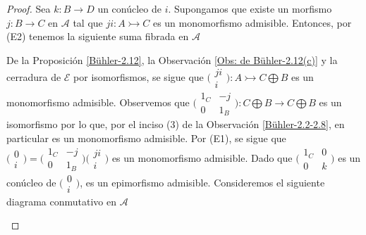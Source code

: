 \documentclass[tesis]{subfiles}
\begin{document}
\begin{proof}
    Sea $k:B\to D$ un conúcleo de $i$. Supongamos que existe un morfismo $j:B\to C$ en $\mathscr{A}$ tal que $ji:A\rightarrowtail C$ es un monomorfismo admisible. Entonces, por (E2) tenemos la siguiente suma fibrada en $\mathscr{A}$
    \begin{center}
    \end{center}
    De la Proposición \ref{Bühler-2.12}, la Observación \ref{Obs: de Bühler-2.12(c)} y la cerradura de $\mathscr{E}$ por isomorfismos, se sigue que $\big(\begin{smallmatrix} ji \\ i \end{smallmatrix}\big):A\rightarrowtail C\bigoplus B$ es un monomorfismo admisible. Observemos que $\big(\begin{smallmatrix} 1_C &-j \\ 0 &1_B \end{smallmatrix}\big):C\bigoplus B\to C\bigoplus B$ es un isomorfismo por lo que, por el inciso (3) de la Observación \ref{Bühler-2.2-2.8}, en particular es un monomorfismo admisible. Por (E1), se sigue que $\big(\begin{smallmatrix} 0 \\ i \end{smallmatrix}\big) = \big(\begin{smallmatrix} 1_C &-j \\ 0 & 1_B \end{smallmatrix}\big) \big(\begin{smallmatrix} ji \\ i \end{smallmatrix}\big)$ es un monomorfismo admisible. Dado que $\big(\begin{smallmatrix} 1_C &0 \\ 0 &k \end{smallmatrix}\big)$ es un conúcleo de $\big(\begin{smallmatrix} 0 \\ i \end{smallmatrix}\big)$, es un epimorfismo admisible. Consideremos el siguiente diagrama conmutativo en $\mathscr{A}$
    \begin{center}

\end{center}
\end{proof}
\end{document}
